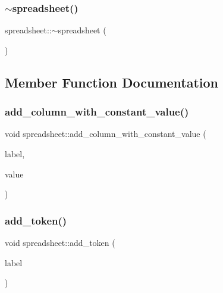 \mbox{\label{classspreadsheet_af22fe49defeebe5eac29e6fe3f2579cf}} 
\subsubsection{\texorpdfstring{$\sim$spreadsheet()}{~spreadsheet()}}
{\footnotesize\ttfamily spreadsheet\+::$\sim$spreadsheet (\begin{DoxyParamCaption}{ }\end{DoxyParamCaption})}



\subsection{Member Function Documentation}
\mbox{\label{classspreadsheet_a783da00dedc0787e8c4a707dbe1f0823}} 
\subsubsection{\texorpdfstring{add\+\_\+column\+\_\+with\+\_\+constant\+\_\+value()}{add\_column\_with\_constant\_value()}}
{\footnotesize\ttfamily void spreadsheet\+::add\+\_\+column\+\_\+with\+\_\+constant\+\_\+value (\begin{DoxyParamCaption}\item[{\mbox{\hyperlink{galois_8h_ab6cc7b4aeb6ea31aba2b3fbfc83ff5e6}{B\+Y\+TE}} $\ast$}]{label,  }\item[{\mbox{\hyperlink{galois_8h_ab6cc7b4aeb6ea31aba2b3fbfc83ff5e6}{B\+Y\+TE}} $\ast$}]{value }\end{DoxyParamCaption})}

\mbox{\label{classspreadsheet_afa02f0e15b3053c03b22e131bb9982fe}} 
\subsubsection{\texorpdfstring{add\+\_\+token()}{add\_token()}}
{\footnotesize\ttfamily void spreadsheet\+::add\+\_\+token (\begin{DoxyParamCaption}\item[{\mbox{\hyperlink{galois_8h_ab6cc7b4aeb6ea31aba2b3fbfc83ff5e6}{B\+Y\+TE}} $\ast$}]{label }\end{DoxyParamCaption})}

